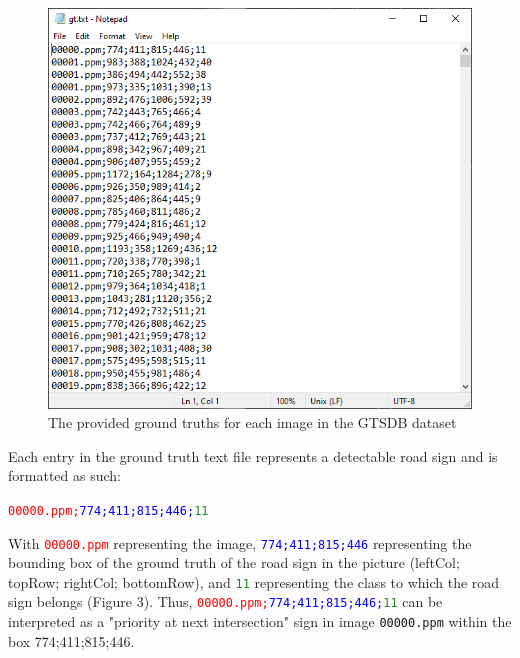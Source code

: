 \documentclass{article}
\begin{document}
            \begin{figure}[h]
                \centering
                \includegraphics[scale=0.5]{ground_truths}
                \caption{The provided ground truths for each image in the GTSDB dataset}
            \end{figure}
        
            Each entry in the ground truth text file represents a detectable road sign and is formatted as such:
            
            \begin{center}
                \texttt{\textcolor{red}{00000.ppm;}\textcolor{blue}{774;411;815;446;}\textcolor{ForestGreen}{11}}
            \end{center}
        
            With \texttt{\textcolor{red}{00000.ppm}} representing the image, \texttt{\textcolor{blue}{774;411;815;446}} representing the bounding box of the ground truth of the road sign in the picture (leftCol; topRow; rightCol; bottomRow), and \texttt{\textcolor{ForestGreen}{11}} representing the class to which the road sign belongs (Figure 3). Thus,  \texttt{\textcolor{red}{00000.ppm;}\textcolor{blue}{774;411;815;446;}\textcolor{ForestGreen}{11}} can be interpreted as a "priority at next intersection" sign in image \texttt{00000.ppm} within the box 774;411;815;446.
            
\end{document}
